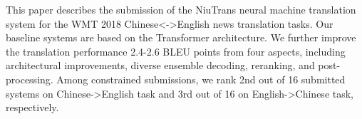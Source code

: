 This paper describes the submission of the NiuTrans neural machine translation system for the WMT 2018 Chinese<->English news translation tasks. Our baseline systems are based on the Transformer architecture. We further improve the translation performance 2.4-2.6 BLEU points from four aspects, including architectural improvements, diverse ensemble decoding, reranking, and post-processing. Among constrained submissions, we rank 2nd out of 16 submitted systems on Chinese->English task and 3rd out of 16 on English->Chinese task, respectively.
